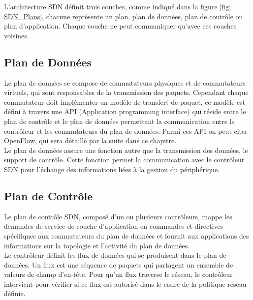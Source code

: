 L’architecture SDN définit trois couches,  comme indiqué dans la figure \ref{fig: SDN_Plans}, chacune représente un plan, plan de données, plan de contrôle ou plan d’application. Chaque couche ne peut communiquer qu’avec ces couches voisines. 

\subsection{Plan de Données}
Le plan de données se compose de commutateurs physiques et de commutateurs virtuels, qui sont responsables de la transmission des paquets. Cependant chaque commutateur doit implémenter un modèle de transfert de paquet, ce modèle est défini à travers une API (Application programming interface) qui réside entre le plan de contrôle et le plan de données permettant la communication entre le contrôleur et les commutateurs du plan de données. Parmi ces API on peut citer OpenFlow, qui sera détaillé par la suite dans ce chapitre.\\

\noindent Le plan de données assure une fonction autre que la transmission des données, le support de contrôle. Cette fonction permet la communication avec le contrôleur SDN pour l’échange des informations liées à la gestion du périphérique.  

\subsection{Plan de Contrôle}
Le plan de contrôle SDN, composé d’un ou plusieurs contrôleurs, mappe les demandes de service de couche d’application en commandes et directives spécifiques aux commutateurs du plan de données et fournit aux applications des informations sur la topologie et l’activité du plan de données.\\

\noindent Le contrôleur définit les flux de données qui se produisent dans le plan de données. Un flux est une séquence de paquets qui partagent un ensemble de valeurs de champ d'en-tête. Pour qu’un flux traverse le réseau, le contrôleur intervient pour vérifier si ce flux est autorisé dans le cadre de la politique réseau définie.\\

